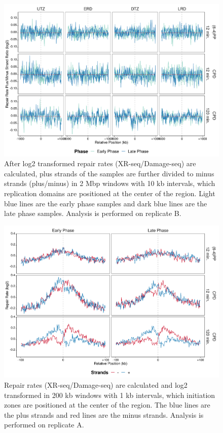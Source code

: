 \begin{figure}[H]
\begin{center}
\includegraphics[width=\textwidth]{Chapters/7_appendix/figures/supfig35}
\caption[Repair rate plus/minus phase ratio of replication domains in 2 Mbp (replicate B).]{After log2 transformed repair rates (XR-seq/Damage-seq) are calculated, plus strands of the samples are further divided to minus strands (plus/minus) in 2 Mbp windows with 10 kb intervals, which replication domains are positioned at the center of the region. Light blue lines are the early phase samples and dark blue lines are the late phase samples. Analysis is performed on replicate B.}
\label{supfig:rrpm2000repdomainB}
\end{center}
\end{figure}

\begin{figure}[H]
\begin{center}
\includegraphics[width=\textwidth]{Chapters/7_appendix/figures/supfig36}
\caption[Repair rate of initiation zones in 200 kb (replicate A).]{Repair rates (XR-seq/Damage-seq) are calculated and log2 transformed in 200 kb windows with 1 kb intervals, which initiation zones are positioned at the center of the region. The blue lines are the plus strands and red lines are the minus strands. Analysis is performed on replicate A.}
\label{supfig:rr200inzonesA}
\end{center}
\end{figure}

